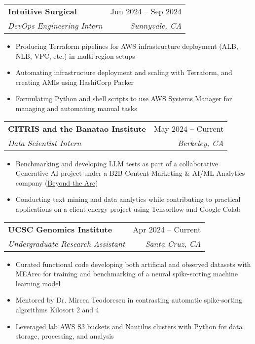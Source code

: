 \documentclass[letterpaper,11pt]{article}
\makeatletter
\newcommand{\resumeItem}[1]{
  \item\small{
    {#1 \vspace{-2pt}}
  }
}
\newcommand{\resumeSubheading}[4]{
  \vspace{-2pt}\item
    \begin{tabular*}{0.97\textwidth}[t]{l@{\extracolsep{\fill}}r}
      \textbf{#1} & #2 \\
      \textit{\small#3} & \textit{\small #4} \\
    \end{tabular*}\vspace{-7pt}
}
\newcommand{\resumeItemListStart}{\begin{itemize}}
\newcommand{\resumeItemListEnd}{\end{itemize}\vspace{-5pt}}
\makeatother
\begin{document}
\resumeSubheading
{Intuitive Surgical}{Jun 2024 -- Sep 2024}
{DevOps Engineering Intern}{Sunnyvale, CA}
\resumeItemListStart
\resumeItem{Producing Terraform pipelines for AWS infrastructure deployment (ALB, NLB, VPC, etc.) in multi-region setups}
\resumeItem{Automating infrastructure deployment and scaling with Terraform, and creating AMIs using HashiCorp Packer}
\resumeItem{Formulating Python and shell scripts to use AWS Systems Manager for managing and automating manual tasks}
\resumeItemListEnd

\resumeSubheading
{CITRIS and the Banatao Institute}{May 2024 -- Current}
{Data Scientist Intern}{Berkeley, CA}
\resumeItemListStart
\resumeItem{Benchmarking and developing LLM tests as part of a collaborative Generative AI project under a B2B Content Marketing \& AI/ML Analytics company (\color[HTML]{0000EE}\href{https://beyondthearc.com}{Beyond the Arc})}
\resumeItem{Conducting text mining and data analytics while contributing to practical applications on a client energy project using Tensorflow and Google Colab}
\resumeItemListEnd

\resumeSubheading
{UCSC Genomics Institute}{Apr 2024 -- Current}
{Undergraduate Research Assistant}{Santa Cruz, CA}
\resumeItemListStart
\resumeItem{Curated functional code developing both artificial and observed datasets with MEArec for training and benchmarking of a neural spike-sorting machine learning model}
\resumeItem{Mentored by Dr. Mircea Teodorescu in contrasting automatic spike-sorting algorithms Kilosort 2 and 4}
\resumeItem{Leveraged lab AWS S3 buckets and Nautilus clusters with Python for data storage, processing, and analysis}
\resumeItemListEnd


\end{document}
